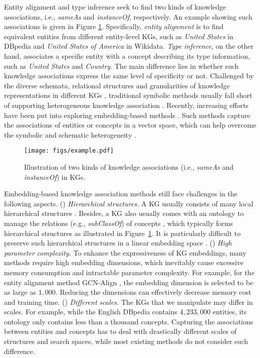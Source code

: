 \documentclass[11pt,a4paper]{article}
\begin{document}
Entity alignment and type inference seek to find two kinds of knowledge associations, i.e., \textit{sameAs} and \textit{instanceOf}, respectively. An example showing such associations is given in Figure \ref{fig:example}. Specifically, \emph{entity alignment} is to find equivalent entities from different entity-level KGs, such as \textit{United States} in DBpedia and \textit{United States of America} in Wikidata. \emph{Type inference}, on the other hand, associates a specific entity with a concept describing its type information, such as \textit{United States} and \textit{Country}. The main difference lies in whether such knowledge associations express the same level of specificity or not. Challenged by the diverse schemata, relational structures and granularities of knowledge representations in different KGs \cite{Schema_Heterogeneity}, traditional symbolic methods usually fall short of supporting heterogeneous knowledge association \cite{PARIS,SIGMa,Type_Inference}. Recently, increasing efforts have been put into exploring embedding-based methods \cite{MTransE,LinkNBed,Entity_Typing}. Such methods capture the associations of entities or concepts in a vector space, which can help overcome the symbolic and schematic heterogeneity \cite{JAPE}.
\begin{figure}[!t]
	\centering 
	\texttt{[image: figs/example.pdf]}
	\caption{Illustration of two kinds of knowledge associations (i.e., \textit{sameAs} and \textit{instanceOf}) in KGs.}\label{fig:example}
	\vspace{-1.2em}
\end{figure}

Embedding-based knowledge association methods still face challenges in the following aspects. () \textit{Hierarchical structures.} A KG usually consists of many local hierarchical structures \cite{EntityHierarchy15}. Besides, a KG also usually comes with an ontology to manage the relations (e.g., \textit{subClassOf}) of concepts \cite{JOIE}, which typically forms hierarchical structures as illustrated in Figure~\ref{fig:example}. It is particularly difficult to preserve such hierarchical structures in a linear embedding space \cite{nickel2014reducing}. () \textit{High parameter complexity.} To enhance the expressiveness of KG embeddings, many methods require high embedding dimensions, which inevitably cause excessive memory consumption and intractable parameter complexity. For example, for the entity alignment method GCN-Align \cite{GCN_Align}, the embedding dimension is selected to be as large as $1,000$. Reducing the dimensions can effectively decrease memory cost and training time. () \textit{Different scales.} The KGs that we manipulate may differ in scales. For example, while the English DBpedia contains $4,233,000$ entities, its ontology only contains less than a thousand concepts. Capturing the associations between entities and concepts has to deal with drastically different scales of structures and search spaces, while most existing methods do not consider such difference.
\end{document}
